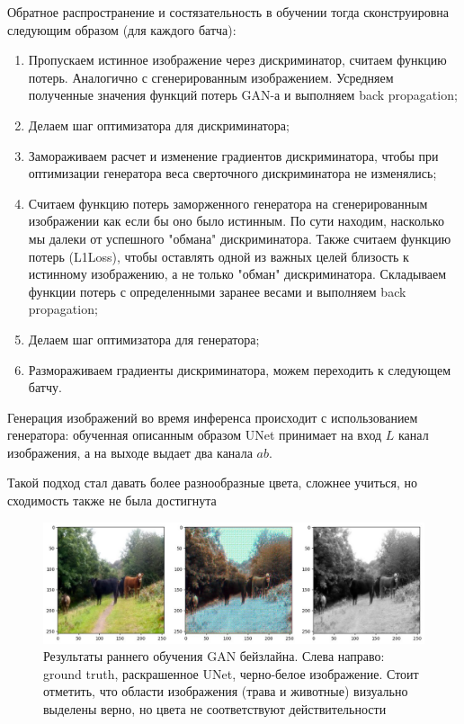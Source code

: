 \documentclass[14pt]{article}
\begin{document}
Обратное распространение и состязательность в обучении тогда сконструировна следующим образом (для каждого батча):
\begin{enumerate}
    \item Пропускаем истинное изображение через дискриминатор, считаем функцию потерь. Аналогично с сгенерированным изображением.
    Усредняем полученные значения функций потерь GAN-а и выполняем back propagation;
    \item Делаем шаг оптимизатора для дискриминатора;
    \item Замораживаем расчет и изменение градиентов дискриминатора, чтобы при оптимизации генератора веса сверточного дискриминатора не изменялись;
    \item Считаем функцию потерь заморженного генератора на сгенерированным изображении как если бы оно было истинным. По сути
    находим, насколько мы далеки от успешного "обмана" дискриминатора. Также считаем функцию потерь (L1Loss), чтобы оставлять одной из важных целей
    близость к истинному изображению, а не только "обман" дискриминатора. 
    Складываем функции потерь с определенными заранее весами и выполняем back propagation;
    \item Делаем шаг оптимизатора для генератора;
    \item Размораживаем градиенты дискриминатора, можем переходить к следующем батчу.
\end{enumerate}

Генерация изображений во время инференса происходит с использованием генератора: обученная описанным образом UNet принимает на вход
$L$ канал изображения, а на выходе выдает два канала $ab$.

Такой подход стал давать более разнообразные цвета, сложнее учиться, но сходимость также не была достигнута

\begin{figure}[H]
    \centering
    \includegraphics[width=1.0\textwidth]{resources/middle_of_gan_baseline.png}
    \caption{Результаты раннего обучения GAN бейзлайна. Слева направо: ground truth, раскрашенное UNet, черно-белое изображение. Стоит отметить,
    что области изображения (трава и животные) визуально выделены верно, но цвета не соответствуют действительности}
    \label{fig:id_figura}
\end{figure}
\end{document}

